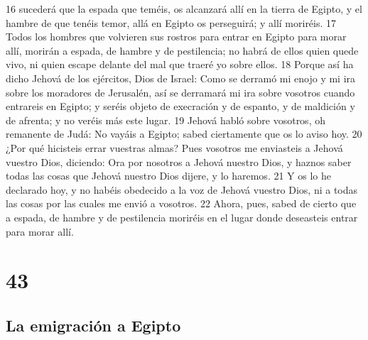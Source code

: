 16 sucederá que la espada que teméis, os alcanzará allí en la tierra de Egipto, y el hambre de que tenéis temor, allá en Egipto os perseguirá; y allí moriréis.
17 Todos los hombres que volvieren sus rostros para entrar en Egipto para morar allí, morirán a espada, de hambre y de pestilencia; no habrá de ellos quien quede vivo, ni quien escape delante del mal que traeré yo sobre ellos.
18 Porque así ha dicho Jehová de los ejércitos, Dios de Israel: Como se derramó mi enojo y mi ira sobre los moradores de Jerusalén, así se derramará mi ira sobre vosotros cuando entrareis en Egipto; y seréis objeto de execración y de espanto, y de maldición y de afrenta; y no veréis más este lugar.
19 Jehová habló sobre vosotros, oh remanente de Judá: No vayáis a Egipto; sabed ciertamente que os lo aviso hoy.
20 ¿Por qué hicisteis errar vuestras almas? Pues vosotros me enviasteis a Jehová vuestro Dios, diciendo: Ora por nosotros a Jehová nuestro Dios, y haznos saber todas las cosas que Jehová nuestro Dios dijere, y lo haremos.
21 Y os lo he declarado hoy, y no habéis obedecido a la voz de Jehová vuestro Dios, ni a todas las cosas por las cuales me envió a vosotros.
22 Ahora, pues, sabed de cierto que a espada, de hambre y de pestilencia moriréis en el lugar donde deseasteis entrar para morar allí.

\chapter{43}

\section*{La emigración a Egipto}

